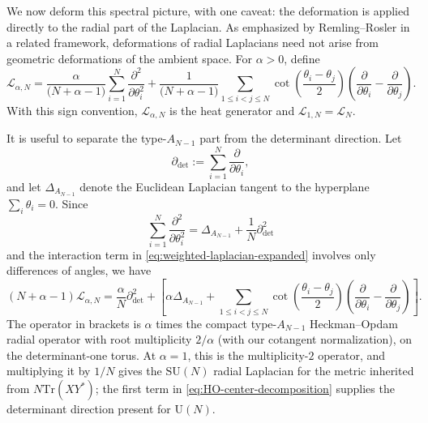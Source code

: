 \documentclass[11pt,a4paper,reqno]{article}
\theoremstyle{definition}
\theoremstyle{remark}
\newcommand\Tr{{\mathrm{Tr}}}
\begin{document}
We now deform this spectral picture, with one caveat: the deformation is applied directly to the radial part of the Laplacian.  As emphasized by Remling--Rosler \cite{RemlingRosler11} in a related framework, deformations of radial Laplacians need not arise from geometric deformations of the ambient space. For $\alpha>0$, define
\begin{equation}\label{eq:weighted-laplacian-expanded}
\mathscr L_{\alpha,N}=\frac{\alpha}{\bigl(N+\alpha-1\bigr)}\sum_{i=1}^N\frac{\partial^2}{\partial\theta_i^2}+\frac{1}{\bigl(N+\alpha-1\bigr)}\sum_{1\leq i<j\leq N}\cot\left(\frac{\theta_i-\theta_j}{2}\right)\left(\frac{\partial}{\partial \theta_i}-\frac{\partial}{\partial \theta_j}\right).
\end{equation}
With this sign convention, $\mathscr L_{\alpha,N}$ is the heat generator and $\mathscr L_{1,N}=\mathscr L_N$.

It is useful to separate the type-$A_{N-1}$ part from the determinant direction.  Let
\[
\partial_{\det}:=\sum_{i=1}^N\frac{\partial}{\partial\theta_i},
\]
and let $\Delta_{A_{N-1}}$ denote the Euclidean Laplacian tangent to the hyperplane $\sum_i\theta_i=0$.  Since
\[
\sum_{i=1}^N\frac{\partial^2}{\partial\theta_i^2}=\Delta_{A_{N-1}}+\frac1N\partial_{\det}^2
\]
and the interaction term in \eqref{eq:weighted-laplacian-expanded} involves only differences of angles, we have
\begin{equation}\label{eq:HO-center-decomposition}
(N+\alpha-1)\mathscr L_{\alpha,N}=\frac{\alpha}{N}\partial_{\det}^2+\left[\alpha\Delta_{A_{N-1}}+\sum_{1\leq i<j\leq N}\cot\left(\frac{\theta_i-\theta_j}{2}\right)\left(\frac{\partial}{\partial\theta_i}-\frac{\partial}{\partial\theta_j}\right)\right].
\end{equation}
The operator in brackets is $\alpha$ times the compact type-$A_{N-1}$ Heckman--Opdam radial operator with root multiplicity $2/\alpha$ (with our cotangent normalization), on the determinant-one torus.  At $\alpha=1$, this is the multiplicity-$2$ operator, and multiplying it by $1/N$ gives the $\mathrm{SU}(N)$ radial Laplacian for the metric inherited from $N\Tr(XY^*)$; the first term in \eqref{eq:HO-center-decomposition} supplies the determinant direction present for $\mathrm U(N)$.
\end{document}
